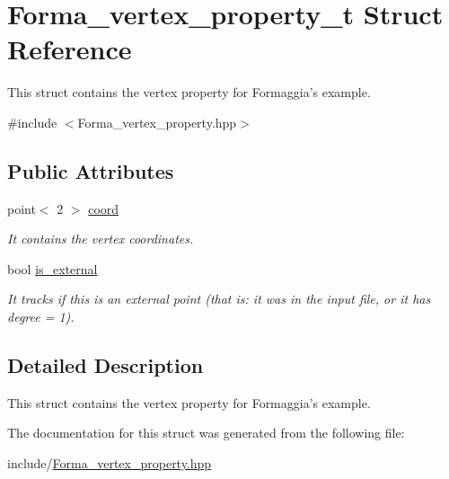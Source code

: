 \hypertarget{structForma__vertex__property__t}{
\section{Forma\_\-vertex\_\-property\_\-t Struct Reference}
\label{structForma__vertex__property__t}
}


This struct contains the vertex property for Formaggia's example.  


{\ttfamily \#include $<$Forma\_\-vertex\_\-property.hpp$>$}\subsection*{Public Attributes}
\begin{DoxyCompactItemize}
\item 
\hypertarget{structForma__vertex__property__t_a7792f3d0a5a4741541196802c2ca7d3d}{
point$<$ 2 $>$ \hyperlink{structForma__vertex__property__t_a7792f3d0a5a4741541196802c2ca7d3d}{coord}}
\label{structForma__vertex__property__t_a7792f3d0a5a4741541196802c2ca7d3d}

\begin{DoxyCompactList}\small\item\em It contains the vertex coordinates. \item\end{DoxyCompactList}\item 
\hypertarget{structForma__vertex__property__t_afc1ef2e547ab724924d69c77a432baf3}{
bool \hyperlink{structForma__vertex__property__t_afc1ef2e547ab724924d69c77a432baf3}{is\_\-external}}
\label{structForma__vertex__property__t_afc1ef2e547ab724924d69c77a432baf3}

\begin{DoxyCompactList}\small\item\em It tracks if this is an external point (that is: it was in the input file, or it has degree = 1). \item\end{DoxyCompactList}\end{DoxyCompactItemize}


\subsection{Detailed Description}
This struct contains the vertex property for Formaggia's example. 

The documentation for this struct was generated from the following file:\begin{DoxyCompactItemize}
\item 
include/\hyperlink{Forma__vertex__property_8hpp}{Forma\_\-vertex\_\-property.hpp}\end{DoxyCompactItemize}
